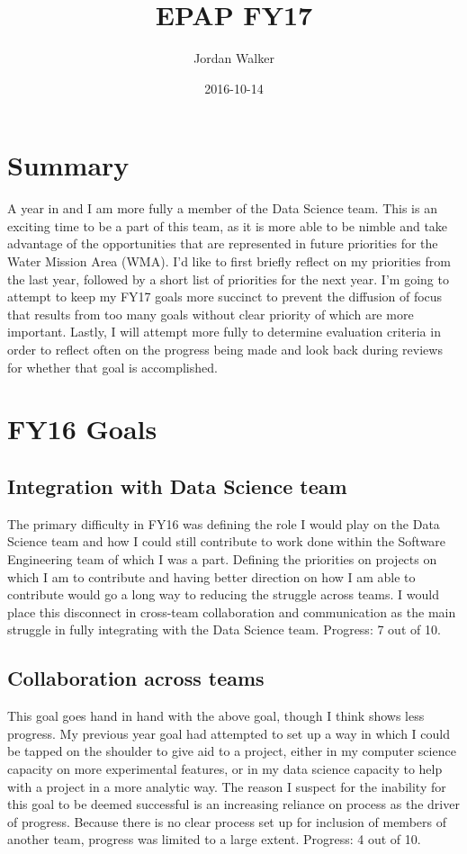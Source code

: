 \documentclass{article}
\title{EPAP FY17}
\author{Jordan Walker}
\date{2016-10-14}
\begin{document}
\maketitle

\section{Summary}

A year in and I am more fully a member of the Data Science team.
This is an exciting time to be a part of this team, as it is more able to be nimble and take advantage of the opportunities that are represented in future priorities for the Water Mission Area (WMA).
I'd like to first briefly reflect on my priorities from the last year, followed by a short list of priorities for the next year.
I'm going to attempt to keep my FY17 goals more succinct to prevent the diffusion of focus that results from too many goals without clear priority of which are more important.
Lastly, I will attempt more fully to determine evaluation criteria in order to reflect often on the progress being made and look back during reviews for whether that goal is accomplished.

\section{FY16 Goals}

\subsection{Integration with Data Science team}

The primary difficulty in FY16 was defining the role I would play on the Data Science team and how I could still contribute to work done within the Software Engineering team of which I was a part.
Defining the priorities on projects on which I am to contribute and having better direction on how I am able to contribute would go a long way to reducing the struggle across teams.
I would place this disconnect in cross-team collaboration and communication as the main struggle in fully integrating with the Data Science team.
Progress: 7 out of 10.

\subsection{Collaboration across teams}

This goal goes hand in hand with the above goal, though I think shows less progress.
My previous year goal had attempted to set up a way in which I could be tapped on the shoulder to give aid to a project, either in my computer science capacity on more experimental features, or in my data science capacity to help with a project in a more analytic way.
The reason I suspect for the inability for this goal to be deemed successful is an increasing reliance on process as the driver of progress.
Because there is no clear process set up for inclusion of members of another team, progress was limited to a large extent.
Progress: 4 out of 10.
\end{document}
